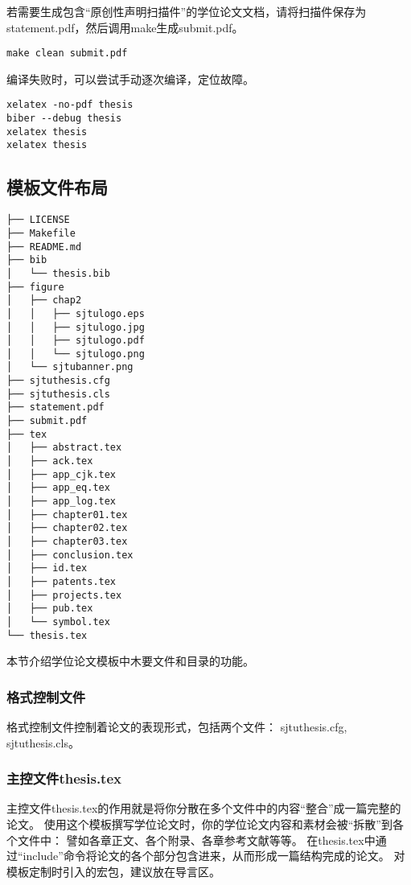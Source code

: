 若需要生成包含“原创性声明扫描件”的学位论文文档，请将扫描件保存为statement.pdf，然后调用make生成submit.pdf。

\begin{lstlisting}[basicstyle=\small\ttfamily, caption={生成用于提交的学位论文}, numbers=none]
make clean submit.pdf
\end{lstlisting}

编译失败时，可以尝试手动逐次编译，定位故障。

\begin{lstlisting}[basicstyle=\small\ttfamily, caption={手动逐次编译}, numbers=none]
xelatex -no-pdf thesis
biber --debug thesis
xelatex thesis
xelatex thesis
\end{lstlisting}

\subsection{模板文件布局}
\label{sec:layout}

\begin{lstlisting}[basicstyle=\small\ttfamily,caption={模板文件布局},label=layout,float,numbers=none]
├── LICENSE
├── Makefile
├── README.md
├── bib
│   └── thesis.bib
├── figure
│   ├── chap2
│   │   ├── sjtulogo.eps
│   │   ├── sjtulogo.jpg
│   │   ├── sjtulogo.pdf
│   │   └── sjtulogo.png
│   └── sjtubanner.png
├── sjtuthesis.cfg
├── sjtuthesis.cls
├── statement.pdf
├── submit.pdf
├── tex
│   ├── abstract.tex
│   ├── ack.tex
│   ├── app_cjk.tex
│   ├── app_eq.tex
│   ├── app_log.tex
│   ├── chapter01.tex
│   ├── chapter02.tex
│   ├── chapter03.tex
│   ├── conclusion.tex
│   ├── id.tex
│   ├── patents.tex
│   ├── projects.tex
│   ├── pub.tex
│   └── symbol.tex
└── thesis.tex
\end{lstlisting}

本节介绍学位论文模板中木要文件和目录的功能。

\subsubsection{格式控制文件}
\label{sec:format}

格式控制文件控制着论文的表现形式，包括两个文件： sjtuthesis.cfg, sjtuthesis.cls。

\subsubsection{主控文件thesis.tex}
\label{sec:thesistex}

主控文件thesis.tex的作用就是将你分散在多个文件中的内容“整合”成一篇完整的论文。
使用这个模板撰写学位论文时，你的学位论文内容和素材会被“拆散”到各个文件中：
譬如各章正文、各个附录、各章参考文献等等。
在thesis.tex中通过“include”命令将论文的各个部分包含进来，从而形成一篇结构完成的论文。
对模板定制时引入的宏包，建议放在导言区。

